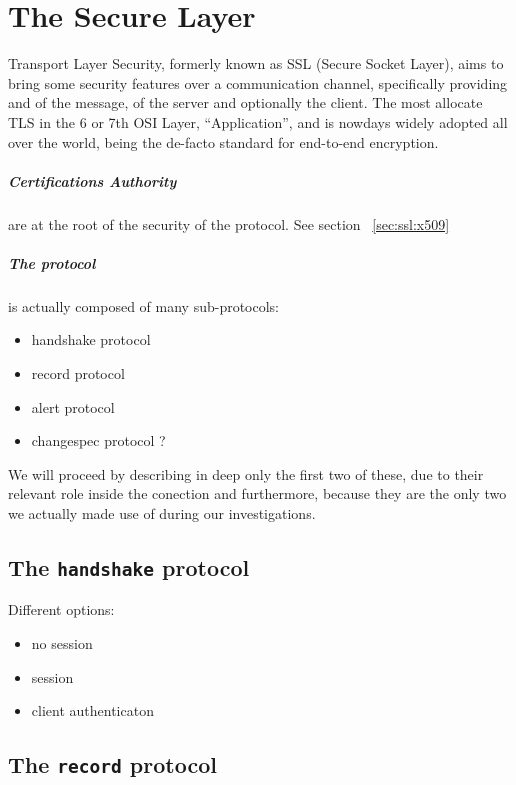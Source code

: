 \chapter{The Secure Layer \label{chap:ssl}}

Transport Layer Security, formerly known as SSL (Secure Socket Layer), aims
to bring some security features over a communication channel, specifically
providing  and  of the message,  of the server and
optionally the client.
The most allocate TLS in the 6 or 7th OSI Layer, ``Application'', and is nowdays widely adopted
all over the world, being the de-facto standard for end-to-end  encryption.

\paragraph{Certifications Authority} are at the root of the security of the
protocol. See section ~\ref{sec:ssl:x509}

\paragraph{The protocol} is actually composed of many sub-protocols:

\begin{itemize}
\item handshake protocol
\item record protocol
\item alert protocol
\item changespec protocol ?
\end{itemize}
We will proceed by describing in deep only the first two of these, due to their
relevant role inside the conection and furthermore, because they are the only
two we actually made use of during our investigations.


\section{The \texttt{handshake} protocol}
Different options:
\begin{itemize}
\item no session
\item session
\item client authenticaton
\end{itemize}


\section{The \texttt{record} protocol}


